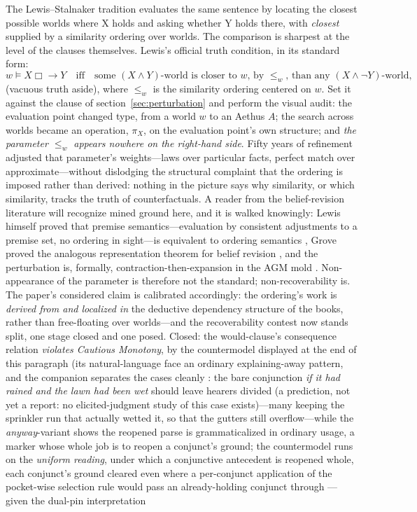 \documentclass[11pt]{article}
\theoremstyle{definition}
\newcommand{\Aethus}{Aethus}
\begin{document}
The Lewis--Stalnaker tradition \cite{lewis1973counterfactuals, stalnaker1968theory} evaluates the same sentence by locating the closest possible worlds where X holds and asking whether Y holds there, with \emph{closest} supplied by a similarity ordering over worlds. The comparison is sharpest at the level of the clauses themselves. Lewis's official truth condition, in its standard form:
\begin{equation*}
w \models X \mathrel{\Box\!\!\rightarrow} Y \quad \text{iff} \quad \text{some } (X \wedge Y)\text{-world is closer to } w \text{, by } \leq_w \text{, than any } (X \wedge \neg Y)\text{-world},
\end{equation*}
(vacuous truth aside), where $\leq_w$ is the similarity ordering centered on $w$. Set it against the clause of section~\ref{sec:perturbation} and perform the visual audit: the evaluation point changed type, from a world $w$ to an \Aethus{} $A$; the search across worlds became an operation, $\pi_X$, on the evaluation point's own structure; and \emph{the parameter $\leq_w$ appears nowhere on the right-hand side}. Fifty years of refinement adjusted that parameter's weights---laws over particular facts, perfect match over approximate---without dislodging the structural complaint that the ordering is imposed rather than derived: nothing in the picture says why similarity, or which similarity, tracks the truth of counterfactuals. A reader from the belief-revision literature will recognize mined ground here, and it is walked knowingly: Lewis himself proved that premise semantics---evaluation by consistent adjustments to a premise set, no ordering in sight---is equivalent to ordering semantics \cite{lewis1981ordering}, Grove proved the analogous representation theorem for belief revision \cite{grove1988two}, and the perturbation is, formally, contraction-then-expansion in the AGM mold \cite{alchourron1985logic}. Non-appearance of the parameter is therefore not the standard; non-recoverability is. The paper's considered claim is calibrated accordingly: the ordering's work is \emph{derived from and localized in} the deductive dependency structure of the books, rather than free-floating over worlds---and the recoverability contest now stands split, one stage closed and one posed. Closed: the would-clause's consequence relation \emph{violates Cautious Monotony}, by the countermodel displayed at the end of this paragraph (its natural-language face an ordinary explaining-away pattern, and the companion separates the cases cleanly \cite{Aethus}: the bare conjunction \emph{if it had rained and the lawn had been wet} should leave hearers divided (a prediction, not yet a report: no elicited-judgment study of this case exists)---many keeping the sprinkler run that actually wetted it, so that the gutters still overflow---while the \emph{anyway}-variant shows the reopened parse is grammaticalized in ordinary usage, a marker whose whole job is to reopen a conjunct's ground; the countermodel runs on the \emph{uniform reading}, under which a conjunctive antecedent is reopened whole, each conjunct's ground cleared even where a per-conjunct application of the pocket-wise selection rule would pass an already-holding conjunct through --- given the dual-pin interpretation 
\end{document}
